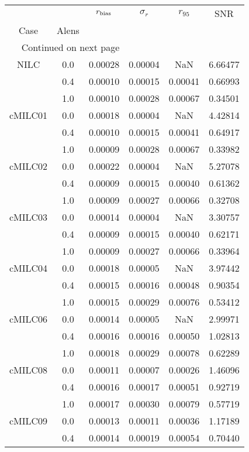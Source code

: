 \begin{longtable}{cccccc}
\toprule
     &     &  $r_{\rm bias}$  &  $\sigma_r$ &  $r_{95}$ &     SNR \\
Case & Alens &                  &             &           &         \\
\midrule
\endhead
\midrule
\multicolumn{3}{r}{{Continued on next page}} \\
\midrule
\endfoot

\bottomrule
\endlastfoot
NILC & 0.0 & 0.00028 & 0.00004 & NaN & 6.66477 \\
     & 0.4 & 0.00010 & 0.00015 & 0.00041 & 0.66993 \\
     & 1.0 & 0.00010 & 0.00028 & 0.00067 & 0.34501 \\
cMILC01 & 0.0 & 0.00018 & 0.00004 & NaN & 4.42814 \\
     & 0.4 & 0.00010 & 0.00015 & 0.00041 & 0.64917 \\
     & 1.0 & 0.00009 & 0.00028 & 0.00067 & 0.33982 \\
cMILC02 & 0.0 & 0.00022 & 0.00004 & NaN & 5.27078 \\
     & 0.4 & 0.00009 & 0.00015 & 0.00040 & 0.61362 \\
     & 1.0 & 0.00009 & 0.00027 & 0.00066 & 0.32708 \\
cMILC03 & 0.0 & 0.00014 & 0.00004 & NaN & 3.30757 \\
     & 0.4 & 0.00009 & 0.00015 & 0.00040 & 0.62171 \\
     & 1.0 & 0.00009 & 0.00027 & 0.00066 & 0.33964 \\
cMILC04 & 0.0 & 0.00018 & 0.00005 & NaN & 3.97442 \\
     & 0.4 & 0.00015 & 0.00016 & 0.00048 & 0.90354 \\
     & 1.0 & 0.00015 & 0.00029 & 0.00076 & 0.53412 \\
cMILC06 & 0.0 & 0.00014 & 0.00005 & NaN & 2.99971 \\
     & 0.4 & 0.00016 & 0.00016 & 0.00050 & 1.02813 \\
     & 1.0 & 0.00018 & 0.00029 & 0.00078 & 0.62289 \\
cMILC08 & 0.0 & 0.00011 & 0.00007 & 0.00026 & 1.46096 \\
     & 0.4 & 0.00016 & 0.00017 & 0.00051 & 0.92719 \\
     & 1.0 & 0.00017 & 0.00030 & 0.00079 & 0.57719 \\
cMILC09 & 0.0 & 0.00013 & 0.00011 & 0.00036 & 1.17189 \\
     & 0.4 & 0.00014 & 0.00019 & 0.00054 & 0.70440 \\

\end{longtable}
